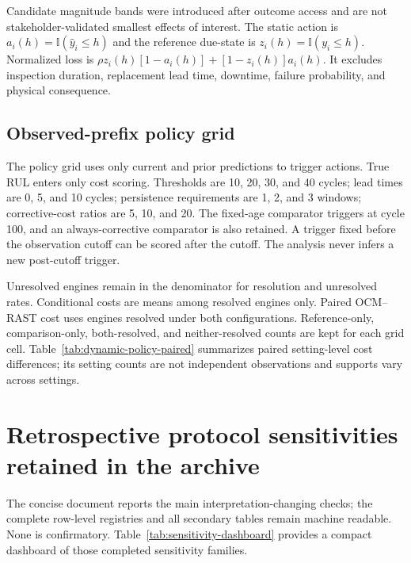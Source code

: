 \documentclass[11pt,a4paper]{article}
\begin{document}
Candidate magnitude bands were introduced after outcome access and are not stakeholder-validated smallest effects of interest. The static action is $a_i(h)=\mathbb I(\hat y_i\le h)$ and the reference due-state is $z_i(h)=\mathbb I(y_i\le h)$. Normalized loss is $\rho z_i(h)[1-a_i(h)]+[1-z_i(h)]a_i(h)$. It excludes inspection duration, replacement lead time, downtime, failure probability, and physical consequence.




\subsection{Observed-prefix policy grid}

The policy grid uses only current and prior predictions to trigger actions. True RUL enters only cost scoring. Thresholds are 10, 20, 30, and 40 cycles; lead times are 0, 5, and 10 cycles; persistence requirements are 1, 2, and 3 windows; corrective-cost ratios are 5, 10, and 20. The fixed-age comparator triggers at cycle 100, and an always-corrective comparator is also retained. A trigger fixed before the observation cutoff can be scored after the cutoff. The analysis never infers a new post-cutoff trigger.

Unresolved engines remain in the denominator for resolution and unresolved rates. Conditional costs are means among resolved engines only. Paired OCM--RAST cost uses engines resolved under both configurations. Reference-only, comparison-only, both-resolved, and neither-resolved counts are kept for each grid cell. Table~\ref{tab:dynamic-policy-paired} summarizes paired setting-level cost differences; its setting counts are not independent observations and supports vary across settings.




\section{Retrospective protocol sensitivities retained in the archive}

The concise document reports the main interpretation-changing checks; the complete row-level registries and all secondary tables remain machine readable. None is confirmatory. Table~\ref{tab:sensitivity-dashboard} provides a compact dashboard of those completed sensitivity families.
\end{document}
